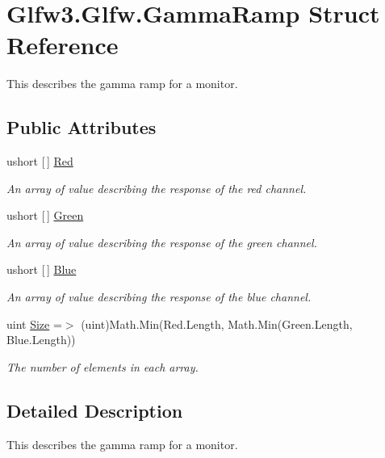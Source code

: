 \hypertarget{struct_glfw3_1_1_glfw_1_1_gamma_ramp}{}\section{Glfw3.\+Glfw.\+Gamma\+Ramp Struct Reference}
\label{struct_glfw3_1_1_glfw_1_1_gamma_ramp}


This describes the gamma ramp for a monitor.  


\subsection*{Public Attributes}
\begin{DoxyCompactItemize}
\item 
ushort \mbox{[}$\,$\mbox{]} \mbox{\hyperlink{struct_glfw3_1_1_glfw_1_1_gamma_ramp_a84fbcb759bc6ec475c94b96ccc0bec8f}{Red}}
\begin{DoxyCompactList}\small\item\em An array of value describing the response of the red channel. \end{DoxyCompactList}\item 
ushort \mbox{[}$\,$\mbox{]} \mbox{\hyperlink{struct_glfw3_1_1_glfw_1_1_gamma_ramp_ab07f4a03b1aec3f118442528bb976f7c}{Green}}
\begin{DoxyCompactList}\small\item\em An array of value describing the response of the green channel. \end{DoxyCompactList}\item 
ushort \mbox{[}$\,$\mbox{]} \mbox{\hyperlink{struct_glfw3_1_1_glfw_1_1_gamma_ramp_acbb91c14d7bd41aeb5488a2608bee7dd}{Blue}}
\begin{DoxyCompactList}\small\item\em An array of value describing the response of the blue channel. \end{DoxyCompactList}\item 
uint \mbox{\hyperlink{struct_glfw3_1_1_glfw_1_1_gamma_ramp_a38e746b1d258843a530476a32dc485d8}{Size}} =$>$ (uint)Math.\+Min(Red.\+Length, Math.\+Min(Green.\+Length, Blue.\+Length))
\begin{DoxyCompactList}\small\item\em The number of elements in each array. \end{DoxyCompactList}\end{DoxyCompactItemize}


\subsection{Detailed Description}
This describes the gamma ramp for a monitor. 


